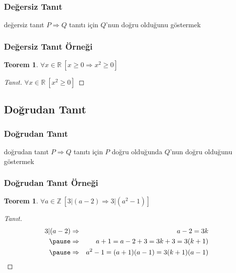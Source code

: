 \documentclass[dvipsnames]{beamer}
\theoremstyle{definition}
\theoremstyle{example}
\theoremstyle{plain}
\newtheorem{teorem}[theorem]{Teorem}
\begin{document}
\begin{frame}
  \frametitle{Değersiz Tanıt}

  \begin{block}{değersiz tanıt}
    $P \Rightarrow Q$ tanıtı için $Q$'nun doğru olduğunu göstermek
  \end{block}
\end{frame}

\begin{frame}
  \frametitle{Değersiz Tanıt Örneği}

  \begin{teorem}
    $\forall x \in \mathbb{R}~[x \geq 0 \Rightarrow x^2 \geq 0]$
  \end{teorem}

  \pause
  \begin{proof}[Tanıt]
    $\forall x \in \mathbb{R}~[x^2 \geq 0]$
  \end{proof}
\end{frame}

\subsection{Doğrudan Tanıt}

\begin{frame}
  \frametitle{Doğrudan Tanıt}

  \begin{block}{doğrudan tanıt}
    $P \Rightarrow Q$ tanıtı için $P$ doğru olduğunda $Q$'nun doğru olduğunu
    göstermek
  \end{block}
\end{frame}

\begin{frame}
  \frametitle{Doğrudan Tanıt Örneği}

  \begin{teorem}
    $\forall a \in \mathbb{Z}~[3 | (a-2) \Rightarrow 3 | (a^2-1)]$
  \end{teorem}

  \pause
  \begin{proof}[Tanıt]
    \begin{eqnarray*}
      3 | (a-2) & \Rightarrow & a-2 = 3k\\\pause
                & \Rightarrow & a+1 = a-2 + 3 = 3k+3 = 3(k+1)\\\pause
                & \Rightarrow & a^2-1 = (a+1)(a-1) = 3(k+1)(a-1)
    \end{eqnarray*}
  \end{proof}
\end{frame}
\end{document}
